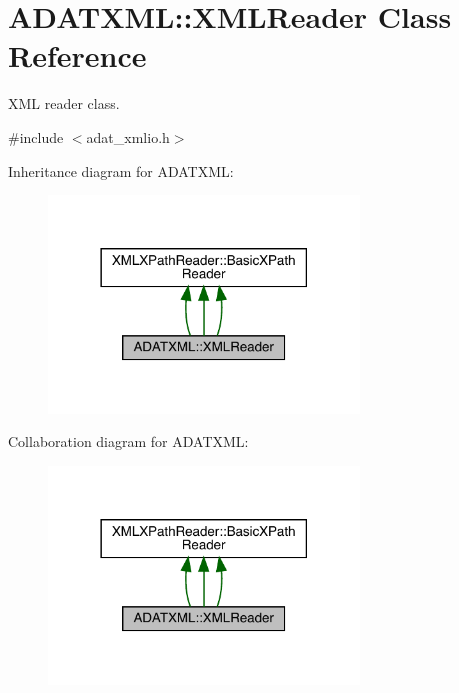 \hypertarget{classADATXML_1_1XMLReader}{}\section{A\+D\+A\+T\+X\+ML\+:\+:X\+M\+L\+Reader Class Reference}
\label{classADATXML_1_1XMLReader}


X\+ML reader class.  




{\ttfamily \#include $<$adat\+\_\+xmlio.\+h$>$}



Inheritance diagram for A\+D\+A\+T\+X\+ML\+:
\nopagebreak
\begin{figure}[H]
\begin{center}
\leavevmode
\includegraphics[width=234pt]{d6/dd2/classADATXML_1_1XMLReader__inherit__graph}
\end{center}
\end{figure}


Collaboration diagram for A\+D\+A\+T\+X\+ML\+:
\nopagebreak
\begin{figure}[H]
\begin{center}
\leavevmode
\includegraphics[width=234pt]{d8/d60/classADATXML_1_1XMLReader__coll__graph}
\end{center}
\end{figure}
